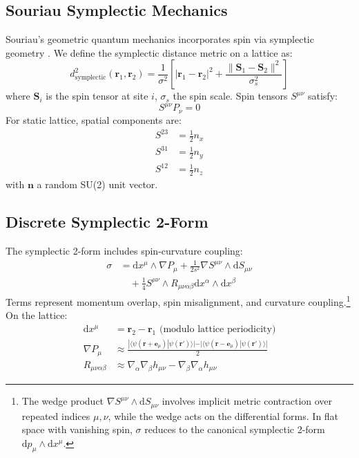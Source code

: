 \documentclass[prd,twocolumn,showpacs,superscriptaddress]{revtex4-2}
\begin{document}
	\subsection{Souriau Symplectic Mechanics}
	
	Souriau's geometric quantum mechanics incorporates spin via symplectic geometry \cite{Souriau1970}. We define the symplectic distance metric on a lattice as:
	\begin{equation}
		d^2_{\text{symplectic}}(\bm{r}_1, \bm{r}_2) = \frac{1}{\sigma^2}\left[|\bm{r}_1 - \bm{r}_2|^2 + \frac{\|\bm{S}_1 - \bm{S}_2\|^2}{\sigma_s^2}\right]
		\label{eq:symplectic_distance}
	\end{equation}
	where \(\bm{S}_i\) is the spin tensor at site \(i\), \(\sigma_s\) the spin scale. Spin tensors \(S^{\mu\nu}\) satisfy:
	\begin{equation}
		S^{\mu\nu} P_\nu = 0
		\label{eq:ssc}
	\end{equation}
	For static lattice, spatial components are:
	\begin{align}
		S^{23} &= \frac{1}{2} n_x \\
		S^{31} &= \frac{1}{2} n_y \\
		S^{12} &= \frac{1}{2} n_z
	\end{align}
	with \(\bm{n}\) a random SU(2) unit vector.
	
	\subsection{Discrete Symplectic 2-Form}
	
	The symplectic 2-form includes spin-curvature coupling:
	\begin{align}
		\sigma &= \mathrm{d}x^\mu \wedge \nabla P_\mu + \frac{1}{2s^2}\nabla S^{\mu\nu} \wedge \mathrm{d}S_{\mu\nu} \nonumber \\
		&\quad + \frac{1}{4}S^{\mu\nu} \wedge R_{\mu\nu\alpha\beta} \mathrm{d}x^\alpha \wedge \mathrm{d}x^\beta
		\label{eq:symplectic_form}
	\end{align}
	Terms represent momentum overlap, spin misalignment, and curvature coupling.\footnote{The wedge product $\nabla S^{\mu\nu} \wedge \mathrm{d}S_{\mu\nu}$ involves implicit metric contraction over repeated indices $\mu,\nu$, while the wedge acts on the differential forms. In flat space with vanishing spin, $\sigma$ reduces to the canonical symplectic 2-form $\mathrm{d}p_\mu \wedge \mathrm{d}x^\mu$.} On the lattice:
	\begin{align}
		\mathrm{d}x^\mu &= \bm{r}_2 - \bm{r}_1 \text{ (modulo lattice periodicity)} \\
		\nabla P_\mu &\approx \frac{|\langle\psi(\bm{r}+\bm{e}_\mu)|\psi(\bm{r}')\rangle| - |\langle\psi(\bm{r}-\bm{e}_\mu)|\psi(\bm{r}')\rangle|}{2} \\
		R_{\mu\nu\alpha\beta} &\approx \nabla_\alpha \nabla_\beta h_{\mu\nu} - \nabla_\beta \nabla_\alpha h_{\mu\nu}
	\end{align}
	
\end{document}

